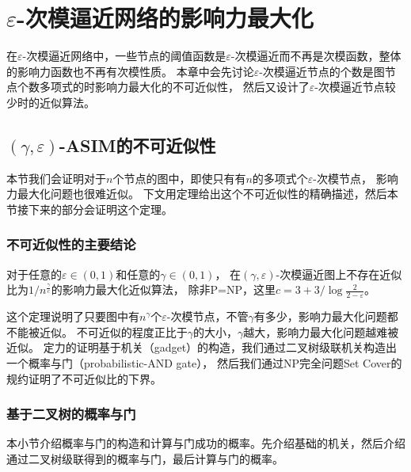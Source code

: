 
\chapter{$\varepsilon$-次模逼近网络的影响力最大化}

在$\varepsilon$-次模逼近网络中，一些节点的阈值函数是$\varepsilon$-次模逼近而不再是次模函数，整体的影响力函数也不再有次模性质。
本章中会先讨论$\varepsilon$-次模逼近节点的个数是图节点个数多项式的时影响力最大化的不可近似性，
然后又设计了$\varepsilon$-次模逼近节点较少时的近似算法。

\section{$(\gamma,\varepsilon)$-ASIM的不可近似性}
本节我们会证明对于$n$个节点的图中，即使只有有$n$的多项式个$\varepsilon$-次模节点，
影响力最大化问题也很难近似。
下文用定理给出这个不可近似性的精确描述，然后本节接下来的部分会证明这个定理。


\subsection{不可近似性的主要结论}
\begin{theorem}
\label{the:inapp}
对于任意的$\varepsilon \in (0,1)$和任意的$\gamma \in (0,1)$，
在$(\gamma,\varepsilon)$-次模逼近图上不存在近似比为$1 / n^{\frac{\gamma}{c}}$的影响力最大化近似算法，
除非P=NP，这里$c = 3+3/\log{\frac{2}{2-\varepsilon}}$。
\end{theorem}

这个定理说明了只要图中有$n^{\gamma}$个$\varepsilon$-次模节点，不管$\gamma$有多少，影响力最大化问题都不能被近似。
不可近似的程度正比于$\gamma$的大小，$\gamma$越大，影响力最大化问题越难被近似。
定力的证明基于机关（gadget）的构造，我们通过二叉树级联机关构造出一个概率与门（probabilistic-AND gate），
然后我们通过NP完全问题Set Cover的规约证明了不可近似比的下界。

\subsection{基于二叉树的概率与门}
本小节介绍概率与门的构造和计算与门成功的概率。先介绍基础的机关，然后介绍通过二叉树级联得到的概率与门，最后计算与门的概率。


